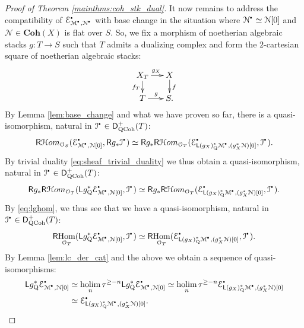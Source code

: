 \documentclass{amsart}
\theoremstyle{plain}
\theoremstyle{definition}
\theoremstyle{remark}
\numberwithin{equation}{section}
\newcommand{\Orb}{\mathcal{O}}
\newcommand{\COH}[1]{\mathbf{Coh}({#1})}
\DeclareMathOperator{\Hom}{Hom}
\newcommand{\trunc}[1]{\tau^{{#1}}}
\newcommand{\RDERF}{\mathsf{R}}
\newcommand{\LDERF}{\mathsf{L}}
\newcommand{\DCAT}{\mathsf{D}}
\newcommand{\RHom}{\RDERF\!\Hom}
\newcommand{\SHom}{\mathcal{H}om}
\newcommand{\SRHom}{\RDERF\SHom}
\newcommand{\homotopic}{\simeq}
\newcommand{\shv}[1]{\mathcal{{#1}}}
\newcommand{\holim}[1]{\underset{#1}{\mathrm{holim}}\,}
\newcommand{\QCPBK}[1]{{#1}_{\mathrm{Q}}^*}
\newcommand{\DQCOH}{\DCAT_{\mathrm{QCoh}}}
\newcommand{\sbt}{\,\begin{picture}(-1,-1)(0,-2)\circle*{1.5}\end{picture}\ }
\newcommand{\cplx}[1]{\shv{{#1}}^{\sbt}}
\begin{document}
\begin{proof}[Proof of Theorem \ref{mainthms:coh_stk_dual}]
  It now remains to address the compatibility of
  $\cplx{E}_{\cplx{M},\cplx{N}}$ with base change in the situation
  where $\cplx{N} \homotopic \shv{N}[0]$ and $\shv{N} \in \COH{X}$ is
  flat over $S$. So, we fix a morphism of noetherian algebraic stacks $g
  : T\to S$ such that $T$ admits a dualizing complex and form the
  $2$-cartesian square of noetherian algebraic stacks: 
  \[
  \xymatrix@-0.8pc{X_T \ar[r]^{g_X} \ar[d]_{f_T} & X \ar[d]^{f} \\ T
    \ar[r]^{g} & S.}
  \]
  By Lemma \ref{lem:base_change} and what we have proven so far, there
  is a quasi-isomorphism, natural in $\cplx{I} \in \DQCOH^+(T)$: 
  \begin{align*}
    \SRHom_{\Orb_S}(\cplx{E}_{\cplx{M},\shv{N}[0]},\RDERF g_*\cplx{I})
    \homotopic \RDERF g_*\SRHom_{\Orb_T}(\cplx{E}_{\LDERF
      \QCPBK{(g_X)}\cplx{M},(g_X^*\shv{N})[0]},\cplx{I}).
  \end{align*}
  By trivial duality \eqref{eq:sheaf_trivial_duality} we thus obtain
  a quasi-isomorphism, natural in $\cplx{I} \in \DQCOH^+(T)$: 
  \[
  \RDERF g_*\SRHom_{\Orb_T}(\LDERF \QCPBK{g}
  \cplx{E}_{\cplx{M},\shv{N}[0]},\cplx{I}) \homotopic \RDERF
  g_*\SRHom_{\Orb_T}(\cplx{E}_{\LDERF 
      \QCPBK{(g_X)}\cplx{M},(g_X^*\shv{N})[0]},\cplx{I}).
  \]
  By \eqref{eq:lghom}, we thus see that we have a quasi-isomorphism,
  natural in $\cplx{I} \in \DQCOH^+(T)$:
  \begin{equation*}
    \RHom_{\Orb_T}(\LDERF \QCPBK{g}
    \cplx{E}_{\cplx{M},\shv{N}[0]},\cplx{I}) \homotopic
    \RHom_{\Orb_T}(\cplx{E}_{\LDERF
      \QCPBK{(g_X)}\cplx{M},(g_X^*\shv{N})[0]},\cplx{I}).
  \end{equation*}  
  By Lemma \ref{lem:lc_der_cat} and the above we obtain a sequence of
  quasi-isomorphisms:
  \begin{align*}
    \LDERF \QCPBK{g} \cplx{E}_{\cplx{M},\shv{N}[0]} &\homotopic \holim{n}
    \trunc{\geq -n}\LDERF \QCPBK{g} \cplx{E}_{\cplx{M},\shv{N}[0]}
    \homotopic \holim{n} \trunc{\geq -n}\cplx{E}_{\LDERF
      \QCPBK{(g_X)}\cplx{M},(g_X^*\shv{N})[0]} \\
    &\homotopic \cplx{E}_{\LDERF
      \QCPBK{(g_X)}\cplx{M},(g_X^*\shv{N})[0]}.\qedhere
  \end{align*} 
\end{proof}
\end{document}
